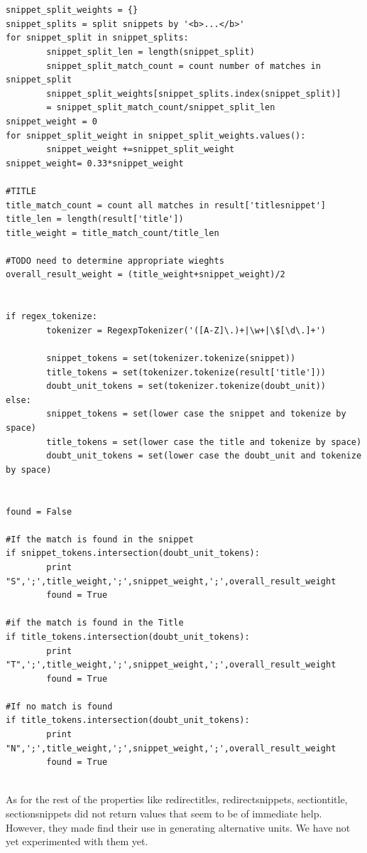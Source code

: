 \documentclass[11pt]{article}
\begin{document}
\begin{lstlisting}[label=pseudo-code,caption=Feature extraction initial steps]


snippet_split_weights = {}
snippet_splits = split snippets by '<b>...</b>' 
for snippet_split in snippet_splits:
        snippet_split_len = length(snippet_split)
        snippet_split_match_count = count number of matches in snippet_split
        snippet_split_weights[snippet_splits.index(snippet_split)] 
		= snippet_split_match_count/snippet_split_len
snippet_weight = 0
for snippet_split_weight in snippet_split_weights.values():
        snippet_weight +=snippet_split_weight
snippet_weight= 0.33*snippet_weight

#TITLE
title_match_count = count all matches in result['titlesnippet']
title_len = length(result['title'])
title_weight = title_match_count/title_len

#TODO need to determine appropriate wieghts
overall_result_weight = (title_weight+snippet_weight)/2


if regex_tokenize:
        tokenizer = RegexpTokenizer('([A-Z]\.)+|\w+|\$[\d\.]+')

        snippet_tokens = set(tokenizer.tokenize(snippet))
        title_tokens = set(tokenizer.tokenize(result['title']))
        doubt_unit_tokens = set(tokenizer.tokenize(doubt_unit))
else:
        snippet_tokens = set(lower case the snippet and tokenize by space)
        title_tokens = set(lower case the title and tokenize by space)
        doubt_unit_tokens = set(lower case the doubt_unit and tokenize by space)


found = False

#If the match is found in the snippet
if snippet_tokens.intersection(doubt_unit_tokens):
        print "S",';',title_weight,';',snippet_weight,';',overall_result_weight
        found = True

#if the match is found in the Title
if title_tokens.intersection(doubt_unit_tokens):
        print "T",';',title_weight,';',snippet_weight,';',overall_result_weight
        found = True

#If no match is found
if title_tokens.intersection(doubt_unit_tokens):
        print "N",';',title_weight,';',snippet_weight,';',overall_result_weight
        found = True


\end{lstlisting}


As for the rest of the properties like redirectitles, redirectsnippets, sectiontitle, sectionsnippets did not return values that seem to be of immediate help. However, they made find their use in generating alternative units. We have not yet experimented with them yet.
\end{document}
